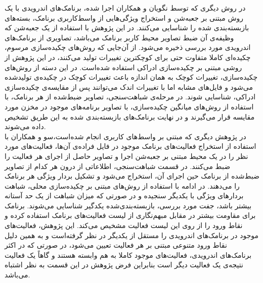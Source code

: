 در روش دیگری که توسط نگویان و همکاران اجرا شده‌، برنامک‌های اندرویدی با یک روش مبتنی بر جعبه‌شن و استخراج ویژگی‌هایی از واسط‌کاربری برنامک، بسته‌های بازبسته‌بندی شده را شناسایی می‌کنند. در این پژوهش با استفاده از یک جعبه‌شن که وظیفه‌ی آن ضبط تصاویر محیط کاربر برنامک می‌باشد، تصاویری از برنامک‌های اندرویدی مورد بررسی ذخیره می‌شود. از آن‌جایی که روش‌های چکیده‌سازی مرسوم، چکیده‌ای کاملا متفاوت حتی برای کوچکترین تغییرات تولید می‌کنند، در این پژوهش از روشی مبتنی بر چکیده‌سازی ادراکی‌ استفاده شده‌است. در این دسته از روش‌های چکیده‌سازی، تغییرات کوچک به همان اندازه باعث تغییرات کوچک در چکیده‌ی تولید‌شده می‌شود و فایل‌های مشابه اما با تغییرات اندک می‌توانند پس از مقایسه‌ی چکیده‌سازی ادراکی، شناسایی شوند. در مرحله‌ی شباهت‌سنجی، تصاویر ضبط‌شده از هر برنامک، با استفاده از روش‌های میانگین چکیده‌سازی‌، با تصاویر برنامه‌های موجود در مخزن مورد مقایسه قرار می‌گیرند و در نهایت برنامک‌های بازبسته‌بندی شده به این طریق تشخیص داده می‌شوند. \\
در پژوهش دیگری که مبتنی بر واسط‌های کاربری انجام‌ شده‌است،سو و همکاران با استفاده از استخراج فعالیت‌های برنامک موجود در فایل‌ فراده‌ی آن‌ها، فعالیت‌های مورد نظر را در یک محیط مبتنی بر جعبه‌شن اجرا و تصاویر حاصل از اجرای هر فعالیت را ضبط می‌کنند. در قسمت شباهت‌سنجی، اطلاعاتی از درون هر کدام از تصاویر ضبط‌شده از برنامک حین اجرای آن‌، استخراج می‌شود و تشکیل بردار ویژگی هر برنامک را می‌دهند. در ادامه با استفاده از روش‌های مبتنی بر چکیده‌سازی محلی‌، شباهت بردار‌های ویژگی با یکدیگر سنجیده و در صورتی که میزان شباهت از یک حد آستانه بیشتر باشد، جفت مورد بررسی، بازبسته‌بندی‌شده‌ یکدگیر شناسایی می‌شوند. برنامک برای مقاومت بیشتر در مقابل مبهم‌نگاری از لیست فعالیت‌های برنامک استفاده کرده و نقاط ورود‌ را از روی این لیست فعالیت مشخیص می‌کند. این پژوهش، فعالیت‌های موجود در برنامک‌های اندرویدی را مستقل از یکدیگر در نظر گرفته‌است و به همین دلیل نقاط ورود متنوعی مبتنی بر هر فعالیت تعیین می‌شود، در صورتی که در اکثر برنامک‌های اندرویدی، فعالیت‌های موجود کاملا به هم وابسته هستند و گاهاً یک فعالیت نتیجه‌ی یک فعالیت دیگر است بنابراین فرض پژوهش در این قسمت به نظر اشتباه می‌باشد.\\
